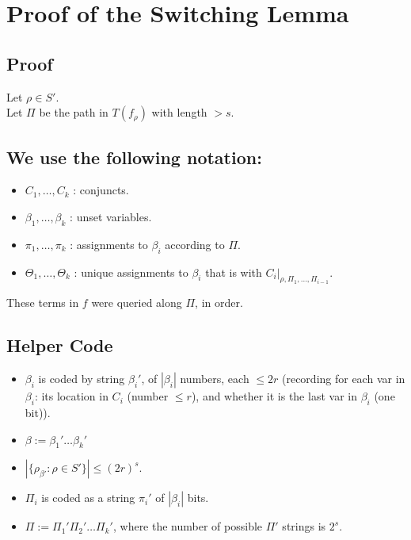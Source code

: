 \section*{Proof of the Switching Lemma}

\subsection*{Proof}
Let \( \rho \in S' \). \\
Let \( \Pi \) be the  path in \( T(f_{\rho}) \) with length \( > s \).

\subsection*{We use the following notation:}
\begin{itemize}
    \item \( C_1, \dots, C_k \) : conjuncts.
    \item \( \beta_1, \dots, \beta_k \) : unset variables.
    \item \( \pi_1, \dots, \pi_k \) : assignments to \( \beta_i \) according to \( \Pi \).
    \item \( \Theta_1, \dots, \Theta_k \) : unique assignments to \( \beta_i \) that is  with \( C_i |_{\rho, \Pi_1, \dots, \Pi_{i-1}} \).
\end{itemize}
These terms in \( f \) were queried along \( \Pi \), in order.

\subsection*{Helper Code}
\begin{itemize}
    \item \( \beta_i \) is coded by string \( \beta_i' \), of \( |\beta_i| \) numbers, each \( \leq 2r \) (recording for each var in \( \beta_i \): its location in \( C_i \) (number \( \leq r \)), and whether it is the last var in \( \beta_i \) (one bit)).
    \item \( \beta := \beta_1' \dots \beta_k' \)
    \item \( |\{\rho_{\beta'} : \rho \in S' \}| \leq (2r)^s \).
    \item \( \Pi_i \) is coded as a string \( \pi_i' \) of \( |\beta_i| \) bits.
    \item \( \Pi := \Pi_1' \Pi_2' \dots \Pi_k' \), where the number of possible \( \Pi' \) strings is \( 2^s \).
\end{itemize}


